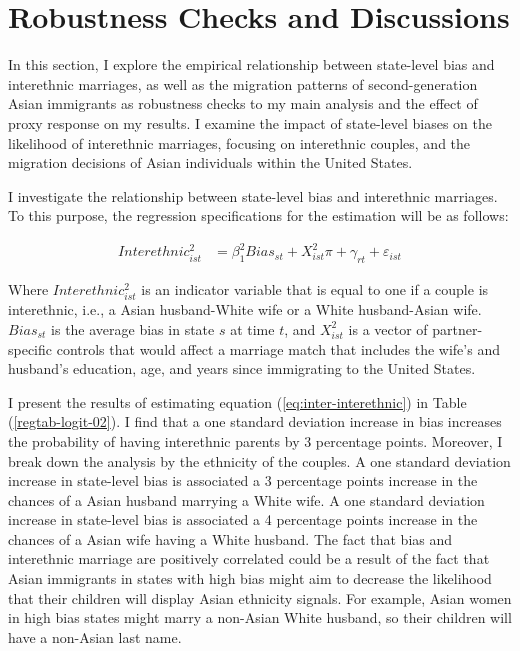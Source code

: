 \section{Robustness Checks and Discussions} %
\label{sec:robcheck}

In this section, I explore the empirical relationship between state-level bias and interethnic marriages, as well as the migration patterns of second-generation Asian immigrants as robustness checks to my main analysis and the effect of proxy response on my results. I examine the impact of state-level biases on the likelihood of interethnic marriages, focusing on interethnic couples, and the migration decisions of Asian individuals within the United States. 

I investigate the relationship between state-level bias and interethnic marriages. To this purpose, the regression specifications for the estimation will be as follows:

\begin{align}
Interethnic_{ist}^2 &= \beta_1^2 Bias_{st} + X_{ist}^2\pi + \gamma_{rt} 
            + \varepsilon_{ist}  \label{eq:inter-interethnic} 
\end{align}

Where $Interethnic_{ist}^2$ is an indicator variable that is equal to one if a couple is interethnic, i.e., a Asian husband-White wife or a White husband-Asian wife. $Bias_{st}$ is the average bias in state $s$ at time $t$, and $X_{ist}^2$ is a vector of partner-specific controls that would affect a marriage match that includes the wife's and husband's education, age, and years since immigrating to the United States. 

I present the results of estimating equation (\ref{eq:inter-interethnic}) in Table (\ref{regtab-logit-02}). I find that a one standard deviation increase in bias increases the probability of having interethnic parents by 3 percentage points. Moreover, I break down the analysis by the ethnicity of the couples. A one standard deviation increase in state-level bias is associated a 3 percentage points increase in the chances of a Asian husband marrying a White wife. A one standard deviation increase in state-level bias is associated a 4 percentage points increase in the chances of a Asian wife having a White husband. The fact that bias and interethnic marriage are positively correlated could be a result of the fact that Asian immigrants in states with high bias might aim to decrease the likelihood that their children will display Asian ethnicity signals. For example, Asian women in high bias states might marry a non-Asian White husband, so their children will have a non-Asian last name.

